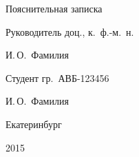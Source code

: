 \begin{centering}
Пояснительная записка \vspace{4em}

\begin{minipage}{0.45\textwidth}
  \begin{flushleft}
    Руководитель доц., к.\ ф.-м.\ н.
  \end{flushleft}
\end{minipage}
\begin{minipage}{0.5\textwidth}
  \begin{flushleft}
    \underline{\hspace{30mm}} И.\,О.~Фамилия
  \end{flushleft}
\end{minipage}

\vspace{1em}

\begin{minipage}{0.45\textwidth}
  \begin{flushleft}
    Студент гр.~АВБ-123456
  \end{flushleft}
\end{minipage}
\begin{minipage}{0.5\textwidth}
  \begin{flushleft}
    \underline{\hspace{30mm}} И.\,О.~Фамилия
  \end{flushleft}
\end{minipage}

\vfill

{\addtolength{\parskip}{-.35em}
Екатеринбург

2015}

\end{centering}
